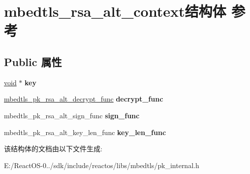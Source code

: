 \hypertarget{structmbedtls__rsa__alt__context}{}\section{mbedtls\+\_\+rsa\+\_\+alt\+\_\+context结构体 参考}
\label{structmbedtls__rsa__alt__context}
\subsection*{Public 属性}
\begin{DoxyCompactItemize}
\item 
\mbox{\label{structmbedtls__rsa__alt__context_a3401cfe1ad6eda2011b67550b75c6cbe}} 
\hyperlink{interfacevoid}{void} $\ast$ {\bfseries key}
\item 
\mbox{\label{structmbedtls__rsa__alt__context_a9aeee8e7912780a2858957c6e9029190}} 
\hyperlink{pk_8h_a01453ce20b7a8d47aaecd90ef9997e24}{mbedtls\+\_\+pk\+\_\+rsa\+\_\+alt\+\_\+decrypt\+\_\+func} {\bfseries decrypt\+\_\+func}
\item 
\mbox{\label{structmbedtls__rsa__alt__context_ac7ab4c3b43c032b0dd1dec664970594b}} 
mbedtls\+\_\+pk\+\_\+rsa\+\_\+alt\+\_\+sign\+\_\+func {\bfseries sign\+\_\+func}
\item 
\mbox{\label{structmbedtls__rsa__alt__context_a5e93d75e2177a223d7909c426b85dac2}} 
mbedtls\+\_\+pk\+\_\+rsa\+\_\+alt\+\_\+key\+\_\+len\+\_\+func {\bfseries key\+\_\+len\+\_\+func}
\end{DoxyCompactItemize}


该结构体的文档由以下文件生成\+:\begin{DoxyCompactItemize}
\item 
E\+:/\+React\+O\+S-\/0../sdk/include/reactos/libs/mbedtls/pk\+\_\+internal.\+h\end{DoxyCompactItemize}
